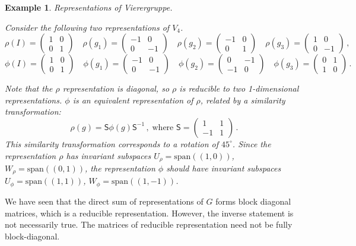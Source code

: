 \documentclass{article}
\theoremstyle{plain}\theoremheaderfont{\normalfont\itshape}\theorembodyfont{\rmfamily}\theoremseparator{.}\newtheorem*{rem}{Remark}\newtheorem*{ex}{Example}\newtheorem*{proof}{Proof}\newtheorem*{altp}{Alternative proof}
\theoremstyle{plain}\theoremheaderfont{\normalfont\bfseries}\theorembodyfont{\rmfamily}\theoremseparator{.}\newtheorem{thm}{Theorem}[section]\newtheorem{lem}[thm]{Lemma}\newtheorem{prop}[thm]{Proposition}\newtheorem*{cor}{Corollary}\newtheorem{defn}[thm]{Definition}\newtheorem{clm}[thm]{Claim}\newtheorem{clminproof}{Claim}
\theoremstyle{break}\theoremheaderfont{\normalfont\itshape}\theorembodyfont{\rmfamily}\theoremseparator{.\medskip}\newtheorem*{proofskip}{Proof}\newtheorem*{exs}{Examples}\newtheorem*{rems}{Remarks}
\theoremstyle{break}\theoremheaderfont{\normalfont\bfseries}\theorembodyfont{\rmfamily}\theoremseparator{.\medskip}\newtheorem{lemskip}[thm]{Lemma}\newtheorem{defnskip}[thm]{Definition}\newtheorem{propskip}[thm]{Proposition}\newtheorem{thmskip}[thm]{Theorem}
\numberwithin{equation}{section}
\begin{document}
	\begin{ex}
		\textit{Representations of Vierergruppe.}

		Consider the following two representations of \(V_4\).
		\[\rho(I)=\begin{pmatrix}
			1 & 0\\
			0 & 1
		\end{pmatrix}\quad\rho(g_1)=\begin{pmatrix}
			-1 & 0\\
			0 & -1
		\end{pmatrix}\quad\rho(g_2)=\begin{pmatrix}
			-1 & 0\\
			0 & 1
		\end{pmatrix}\quad\rho(g_3)=\begin{pmatrix}
			1 & 0\\
			0 & -1
		\end{pmatrix}\,,\]
		\[\phi(I)=\begin{pmatrix}
			1 & 0\\
			0 & 1
		\end{pmatrix}\quad\phi(g_1)=\begin{pmatrix}
			-1 & 0\\
			0 & -1
		\end{pmatrix}\quad\phi(g_2)=\begin{pmatrix}
			0 & -1\\
			-1 & 0
		\end{pmatrix}\quad\phi(g_3)=\begin{pmatrix}
			0 & 1\\
			1 & 0
		\end{pmatrix}\,.\]

		Note that the \(\rho\) representation is diagonal, so \(\rho\) is reducible to two 1-dimensional representations. \(\phi\) is an equivalent representation of \(\rho\), related by a similarity transformation:
		\[\rho(g)=\mathsf{S}\phi(g)\mathsf{S}^{-1}\,,\;\text{where } \mathsf{S}=\begin{pmatrix}
			1 & 1\\
			-1 & 1
		\end{pmatrix}\,.\]
		This similarity transformation corresponds to a rotation of \(45^\circ\). Since the representation \(\rho\) has invariant subspaces \(U_\rho=\mathrm{span}((1,0))\), \(W_\rho=\mathrm{span}((0,1))\), the representation \(\phi\) should have invariant subspaces \(U_\phi=\mathrm{span}((1,1))\), \(W_\phi=\mathrm{span}((1,-1))\).
	\end{ex}
	We have seen that the direct sum of representations of \(G\) forms block diagonal matrices, which is a reducible representation. However, the inverse statement is not necessarily true. The matrices of reducible representation need not be fully block-diagonal.
	
\end{document}
